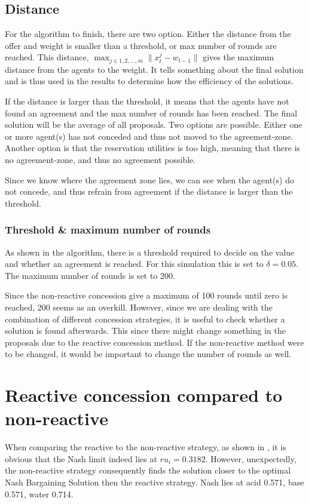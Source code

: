 \subsection{Distance}
For the algorithm  to finish, there are two option. Either the distance from the offer and weight is smaller than a threshold, or max number of rounds are reached. This distance, $\max_{ j \in {1,2,...,m}} \parallel x^j_t-w_{t-1} \parallel$ gives the maximum distance from the agents to the weight. It tells something about the final solution and is thus used in the results to determine how the efficiency of the solutions. 

If the distance is larger than the threshold, it means that the agents have not found an agreement and the max number of rounds has been reached. The final solution will be the average of all proposals. Two options are possible. Either one or more agent(s) has not conceded and thus not moved to the agreement-zone. Another option is that the reservation utilities is too high, meaning that there is no agreement-zone, and thus no agreement possible. 

Since we know where the agreement zone lies, we can see when the agent(s) do not concede, and thus refrain from agreement if the distance is larger than the threshold.


\subsubsection{Threshold \& maximum number of rounds}
As shown in the algorithm, there is a threshold required to decide on the value and whether an agreement is reached. For this simulation this is set to $\delta = 0.05$.	The maximum number of rounds is set to $200$.

Since the non-reactive concession give a maximum of 100 rounds until zero is reached, 200 seems as an overkill. However, since we are dealing with the combination of different concession strategies, it is useful to check whether a solution is found afterwards. This since there might change something in the proposals due to the reactive concession method. If the non-reactive method were to be changed, it would be important to change the number of rounds as well. 

\section{Reactive concession compared to non-reactive}
When comparing the reactive to the non-reactive strategy, as shown in , it is obvious that the Nash limit indeed lies at $ru_i = 0.3182$. However, unexpectedly, the non-reactive strategy consequently finds the solution closer to the optimal Nash Bargaining Solution then the reactive strategy.  Nash lies at acid 0.571, base 0.571, water 0.714.

